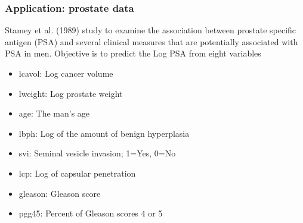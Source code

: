 \documentclass[compress, smaller, serif, 9pt]{beamer}
\begin{document}
\begin{frame}
  \frametitle{Application: prostate data}
 Stamey et al. (1989) study to examine the association between prostate specific antigen (PSA) and several
clinical measures that are potentially associated with PSA in men. Objective is to predict the Log PSA from eight variables  
\begin{itemize}
 \item lcavol: Log cancer volume
 \item lweight: Log prostate weight
  \item age: The man’s age
 \item lbph: Log of the amount of benign hyperplasia
 \item svi: Seminal vesicle invasion; 1=Yes, 0=No
 \item lcp: Log of capsular penetration
 \item gleason: Gleason score
 \item pgg45: Percent of Gleason scores 4 or 5
\end{itemize}
\end{frame}
\end{document}
